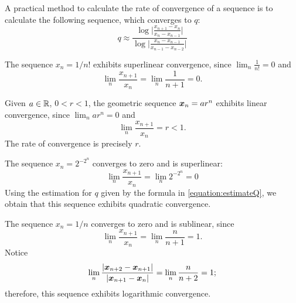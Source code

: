 A practical method to calculate the rate of convergence of a sequence is to calculate the following sequence, which converges to $q$:
\begin{equation}\label{equation:estimateQ}
q \approx \frac{\log\big\lvert \frac{x_{n+1}-x_n}{x_n-x_{n-1}} \big\rvert}{\log\big\lvert \frac{x_n-x_{n-1}}{x_{n-1}-x_{n-2}} \big\rvert}
\end{equation}

\begin{example}
The sequence $x_n = 1/n!$ exhibits superlinear convergence, since $\lim_n \frac{1}{n!}=0$ and 
\begin{equation*}
\lim_n \frac{x_{n+1}}{x_n} = \lim_n \frac{1}{n+1} = 0.
\end{equation*}
\end{example}

\begin{example}
Given $a \in \mathbb{R}$, $0<r<1$, the geometric sequence $\boldsymbol{x}_n = ar^n$ exhibits linear convergence, since $\lim_n ar^n = 0$ and
\begin{equation*}
\lim_n \frac{x_{n+1}}{x_n} = r < 1.
\end{equation*}
The rate of convergence is precisely $r$.
\end{example}

\begin{example}
The sequence $x_n = 2^{-2^n}$ converges to zero and is superlinear:
\begin{equation*}
\lim_n \frac{x_{n+1}}{x_n} = \lim_n 2^{-2^n} = 0
\end{equation*}
Using the estimation for $q$ given by the formula in \eqref{equation:estimateQ}, we obtain that this sequence exhibits quadratic convergence.
\end{example}

\begin{example}
The sequence $x_n = 1/n$ converges to zero and is sublinear, since
\begin{equation*}
\lim_n \frac{x_{n+1}}{x_n} = \lim_n \frac{n}{n+1} = 1.
\end{equation*}
Notice 
\begin{equation*}
\lim_n \frac{\lvert \boldsymbol{x}_{n+2} - \boldsymbol{x}_{n+1} \rvert}{\lvert \boldsymbol{x}_{n+1} - \boldsymbol{x}_n \rvert} = \lim_n \frac{n}{n+2} = 1;
\end{equation*}
therefore, this sequence exhibits logarithmic convergence.
\end{example}
